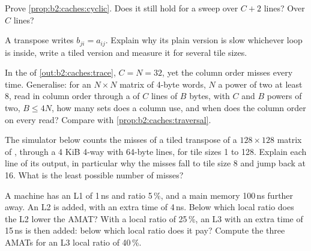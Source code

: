 \begin{exercise}[$\star\star$]\label{exo:b2:caches:8}
Prove \cref{prop:b2:caches:cyclic}. Does it still hold for a sweep over $C + 2$ lines? Over $C$ lines?
\end{exercise}

\begin{exercise}[$\star\star$]\label{exo:b2:caches:9}
A transpose writes $b_{ji} = a_{ij}$. Explain why its plain version is slow whichever loop is inside, write a tiled
version and measure it for several tile sizes.
\end{exercise}

\begin{exercise}[$\star\star\star$]\label{exo:b2:caches:10}
In the  of \cref{out:b2:caches:trace}, $C = N = 32$, yet the column order misses every time.
Generalise: for an $N \times N$ matrix of 4-byte words, $N$ a power of two at least 8, read in column order through a
 of $C$ lines of $B$ bytes, with $C$ and $B$ powers of two, $B \le 4N$, how many sets does a column
use, and when does the column order  on every read? Compare with \cref{prop:b2:caches:traversal}.
\end{exercise}

\begin{exercise}[$\star\star\star$]\label{exo:b2:caches:11}
The simulator below counts the misses of a tiled transpose of a $128 \times 128$ matrix of , through a
4 KiB 4-way  with 64-byte lines, for tile sizes 1 to 128. Explain each line of its output, in particular why the
misses fall to tile size 8 and jump back at 16. What is the least possible number of misses?
\end{exercise}

\begin{exercise}[$\star\star\star$]\label{exo:b2:caches:12}
A machine has an L1 of  1\,ns and  ratio 5\,\%, and a main memory 100\,ns further away. An L2 is added,
with an extra time of 4\,ns. Below which local  ratio does the L2 lower the AMAT? With a local  ratio of
25\,\%, an L3 with an extra time of 15\,ns is then added: below which local  ratio does it pay? Compute the three
AMATs for an L3 local  ratio of 40\,\%.
\end{exercise}

